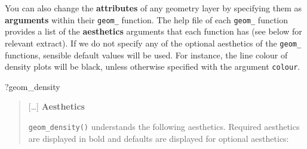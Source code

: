 \documentclass[
  letterpaper,
  DIV=11,
  numbers=noendperiod]{scrreprt}
\newenvironment{Shaded}{\begin{snugshade}}{\end{snugshade}}
\newcommand{\NormalTok}[1]{\textcolor[rgb]{0.00,0.23,0.31}{#1}}
\begin{document}
\begin{tcolorbox}[enhanced jigsaw, arc=.35mm, bottomrule=.15mm, bottomtitle=1mm, breakable, colback=white, colbacktitle=quarto-callout-note-color!10!white, colframe=quarto-callout-note-color-frame, coltitle=black, left=2mm, leftrule=.75mm, opacityback=0, opacitybacktitle=0.6, rightrule=.15mm, title=\textcolor{quarto-callout-note-color}{\faInfo}\hspace{0.5em}{Going further: Setting properties within geoms}, titlerule=0mm, toprule=.15mm, toptitle=1mm]

You can also change the \textbf{attributes} of any geometry layer by
specifying them as \textbf{arguments} within their \texttt{geom\_}
function. The help file of each \texttt{geom\_} function provides a list
of the \textbf{aesthetics} arguments that each function has (see below
for relevant extract). If we do not specify any of the optional
aesthetics of the \texttt{geom\_} functions, sensible default values
will be used. For instance, the line colour of density plots will be
black, unless otherwise specified with the argument \texttt{colour}.

\begin{Shaded}
\begin{Highlighting}[]
\NormalTok{?geom\_density}
\end{Highlighting}
\end{Shaded}

\begin{quote}
{[}\ldots{]} \textbf{Aesthetics}

\texttt{geom\_density()} understands the following aesthetics. Required
aesthetics are displayed in bold and defaults are displayed for optional
aesthetics:


\end{quote}
\end{tcolorbox}
\end{document}
